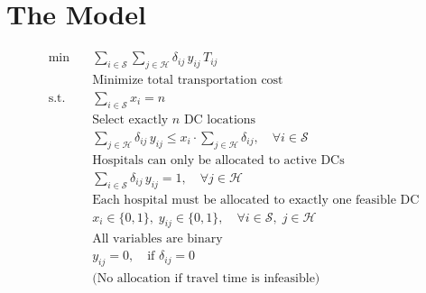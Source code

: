 \documentclass{article}
\begin{document}
\section{The Model}
\begin{align*}
    \min \quad & \sum_{i \in \mathcal{S}} \sum_{j \in \mathcal{H}} \delta_{ij} \, y_{ij} \, T_{ij} \\
    & \text{Minimize total transportation cost} \\[6pt]
    \text{s.t.} \quad & \sum_{i \in \mathcal{S}} x_i = n \\
    & \text{Select exactly } n \text{ DC locations} \\[6pt]
    & \sum_{j \in \mathcal{H}} \delta_{ij} \, y_{ij} \leq x_i \cdot \sum_{j \in \mathcal{H}} \delta_{ij}, \quad \forall i \in \mathcal{S} \\
    & \text{Hospitals can only be allocated to active DCs} \\[6pt]
    & \sum_{i \in \mathcal{S}} \delta_{ij} \, y_{ij} = 1, \quad \forall j \in \mathcal{H} \\
    & \text{Each hospital must be allocated to exactly one feasible DC} \\[6pt]
    & x_i \in \{0,1\}, \; y_{ij} \in \{0,1\}, \quad \forall i \in \mathcal{S}, \; j \in \mathcal{H} \\
    & \text{All variables are binary} \\[6pt]
    & y_{ij} = 0, \quad \text{if } \delta_{ij} = 0 \\
    & \text{(No allocation if travel time is infeasible)} 
\end{align*}
\end{document}
